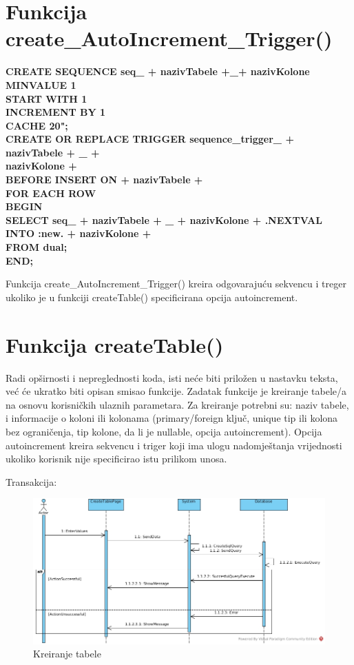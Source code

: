 \documentclass[12pt, a4paper]{report}
\theoremstyle{definition}
\begin{document}
\section{Funkcija create\_AutoIncrement\_Trigger()}

\textbf{CREATE SEQUENCE seq\_ + nazivTabele +\_+ nazivKolone \\
MINVALUE 1 \\
START WITH 1 \\
INCREMENT BY 1 \\
CACHE 20";\\
CREATE OR REPLACE TRIGGER sequence\_trigger\_ + nazivTabele + \_ + \\
nazivKolone + \\
BEFORE INSERT ON + nazivTabele + \\
FOR EACH ROW \\
BEGIN \\
SELECT seq\_ + nazivTabele + \_ + nazivKolone + .NEXTVAL \\
INTO :new. + nazivKolone + \\
FROM dual; \\
END;}

Funkcija create\_AutoIncrement\_Trigger() kreira odgovarajuću sekvencu i treger ukoliko je u funkciji createTable() specificirana opcija autoincrement. 


\section{Funkcija createTable()}
Radi opširnosti i nepreglednosti koda, isti neće biti priložen u nastavku teksta, već će ukratko biti opisan smisao funkcije. 
Zadatak funkcije je kreiranje tabele/a na osnovu korisničkih ulaznih parametara. Za kreiranje potrebni su: naziv tabele, i informacije o koloni ili kolonama (primary/foreign ključ, unique tip ili kolona bez ograničenja, tip kolone, da li je nullable, opcija autoincrement). Opcija autoincrement kreira sekvencu i triger koji ima ulogu nadomještanja vrijednosti ukoliko korisnik nije specificirao istu prilikom unosa. 


Transakcija:
\begin{figure}[H]
	\begin{center} 
		\includegraphics[height=0.5\textwidth]{CreateTable.jpg}
	\end{center}
	\caption{Kreiranje tabele}
\end{figure}
\end{document}
